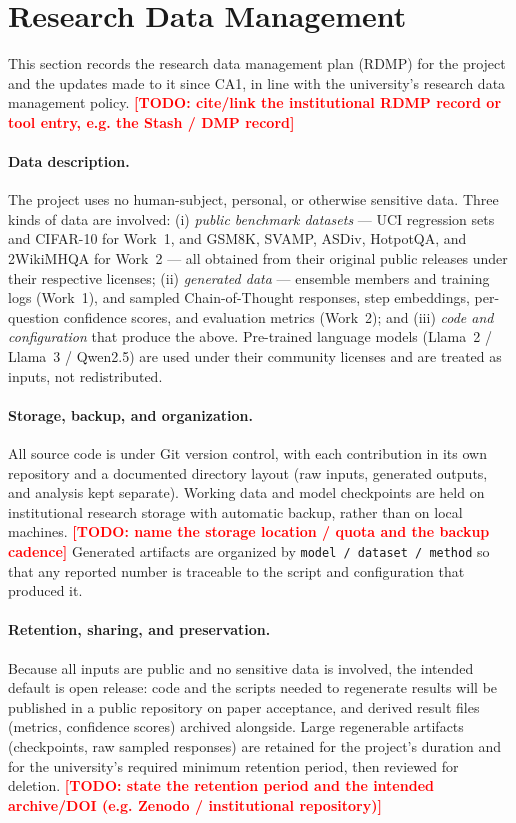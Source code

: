 \documentclass[11pt]{article}
\newcommand{\TODO}[1]{\textcolor{red}{\textbf{[TODO: #1]}}}
\begin{document}
\section{Research Data Management}
\label{sec:rdm}

This section records the research data management plan (RDMP) for the project and the updates made
to it since CA1, in line with the university's research data management policy.
\TODO{cite/link the institutional RDMP record or tool entry, e.g. the Stash / DMP record}

\paragraph{Data description.}
The project uses no human-subject, personal, or otherwise sensitive data. Three kinds of data are
involved: (i) \emph{public benchmark datasets} --- UCI regression sets and CIFAR-10 for Work~1, and
GSM8K, SVAMP, ASDiv, HotpotQA, and 2WikiMHQA for Work~2 --- all obtained from their original public
releases under their respective licenses; (ii) \emph{generated data} --- ensemble members and
training logs (Work~1), and sampled Chain-of-Thought responses, step embeddings, per-question
confidence scores, and evaluation metrics (Work~2); and (iii) \emph{code and configuration} that
produce the above. Pre-trained language models (Llama~2 / Llama~3 / Qwen2.5) are used under their community
licenses and are treated as inputs, not redistributed.

\paragraph{Storage, backup, and organization.}
All source code is under Git version control, with each contribution in its own repository and a
documented directory layout (raw inputs, generated outputs, and analysis kept separate). Working
data and model checkpoints are held on institutional research storage with automatic backup, rather
than on local machines. \TODO{name the storage location / quota and the backup cadence}
Generated artifacts are organized by \texttt{model / dataset / method} so that any reported number
is traceable to the script and configuration that produced it.

\paragraph{Retention, sharing, and preservation.}
Because all inputs are public and no sensitive data is involved, the intended default is open
release: code and the scripts needed to regenerate results will be published in a public repository
on paper acceptance, and derived result files (metrics, confidence scores) archived alongside.
Large regenerable artifacts (checkpoints, raw sampled responses) are retained for the project's
duration and for the university's required minimum retention period, then reviewed for deletion.
\TODO{state the retention period and the intended archive/DOI (e.g. Zenodo / institutional repository)}
\end{document}
